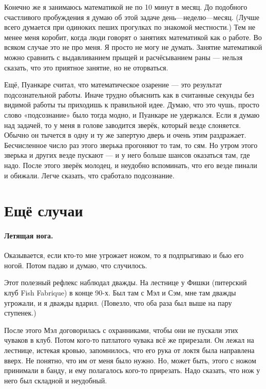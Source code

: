 \documentclass{book}
\begin{document}
Конечно же я занимаюсь математикой не по 10 минут в месяц.
До подобного счастливого пробуждения я думаю об этой задаче день---неделю---месяц.
(Лучше всего думается при одиноких пеших прогулках по знакомой местности.)
Тем не менее меня коробит, когда люди говорят о занятиях математикой как о работе.
Во всяком случае это не про меня.
Я просто не могу не думать.
Занятие математикой можно сравнить с выдавливанием прыщей и расчёсыванием раны --- нельзя сказать, что это приятное занятие, но не оторваться.

Ещё, Пуанкаре считал, что математическое озарение --- это результат подсознательной работы.
Иначе трудно объяснить как в считанные секунды без видимой работы ты приходишь к правильной идее.
Думаю, что это чушь, просто слово «подсознание» было тогда модно, и Пуанкаре не удержался.
Если я думаю над задачей, то у меня в голове заводится зверёк, который везде слоняется.
Обычно он тычется в одну и ту же запертую дверь и очень этим раздражает.
Бесчисленное число раз этого зверька прогоняют то там, то сям.
Но утром этого зверька и других везде пускают --- и у него больше шансов оказаться там, где надо.
После этого зверёк молодец, и неудобно вспоминать, что его везде пинали и обижали.
Легче сказать, что сработало подсознание.


\section*{Ещё случаи}

\paragraph{Летящая нога.}
Оказывается, если кто-то мне угрожает ножом, то я подпрыгиваю и бью его ногой.
Потом падаю и думаю, что случилось.

Этот полезный рефлекс наблюдал дважды.
На лестнице у Фишки (питерский клуб Fish Fabrique) в конце 90-х.
Был там с Мэл и Сэм, мне там дважды угрожали, и я дважды вдарил.
(Повезло, что оба раза был выше на пару ступенек.)

После этого Мэл договорилась с охранниками, чтобы они не пускали этих чуваков в клуб.
Потом кого-то патлатого чувака всё же прирезали.
Он лежал на лестнице, истекая кровью, запомнилось, что его рука от локтя была направлена вверх. 
Не понятно, что им от меня было нужно.
Но, может быть, этого с ножом принимали в банду, и ему полагалось кого-то прирезать.
Надо сказать, что нож у него был складной и неудобный.
\end{document}
